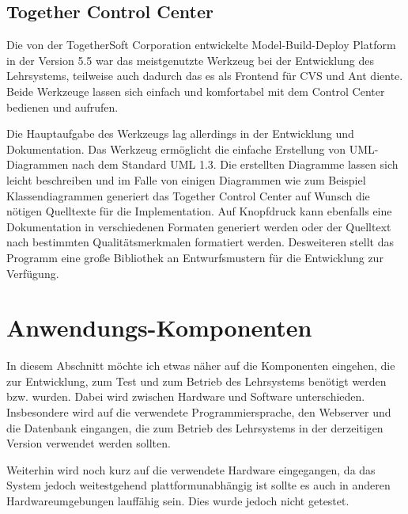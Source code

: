 \subsection{Together Control Center}

Die von der TogetherSoft Corporation entwickelte Model-Build-Deploy Platform in der Version 5.5
war das meistgenutzte Werkzeug bei der Entwicklung des Lehrsystems, teilweise auch dadurch
das es als Frontend f\"ur CVS und Ant diente. Beide Werkzeuge lassen sich einfach und komfortabel
mit dem Control Center bedienen und aufrufen.

Die Hauptaufgabe des Werkzeugs lag allerdings in der Entwicklung und Dokumentation. Das Werkzeug
erm\"oglicht die einfache Erstellung von UML-Diagrammen nach dem Standard UML 1.3. Die erstellten
Diagramme lassen sich leicht beschreiben und im Falle von einigen Diagrammen wie zum Beispiel
Klassendiagrammen generiert das Together Control Center auf Wunsch die n\"otigen Quelltexte f\"ur
die Implementation. Auf Knopfdruck kann ebenfalls eine Dokumentation in verschiedenen Formaten
generiert werden oder der Quelltext nach bestimmten Qualit\"atsmerkmalen formatiert werden. 
Desweiteren stellt das Programm eine gro{\ss}e Bibliothek an Entwurfsmustern f\"ur die Entwicklung
zur Verf\"ugung.

\section{Anwendungs-Komponenten}
In diesem Abschnitt m\"ochte ich etwas n\"aher auf die Komponenten eingehen, die zur
Entwicklung, zum Test und zum Betrieb des Lehrsystems ben\"otigt werden bzw. wurden.
Dabei wird zwischen Hardware und Software unterschieden. Insbesondere wird
auf die verwendete Programmiersprache, den Webserver und die Datenbank eingangen, die
zum Betrieb des Lehrsystems in der derzeitigen Version verwendet werden sollten. 

Weiterhin wird noch kurz auf die verwendete Hardware eingegangen, da das System jedoch weitestgehend
plattformunabh\"angig ist sollte es auch in anderen Hardwareumgebungen lauff\"ahig sein. Dies
wurde jedoch nicht getestet.

\newpage

